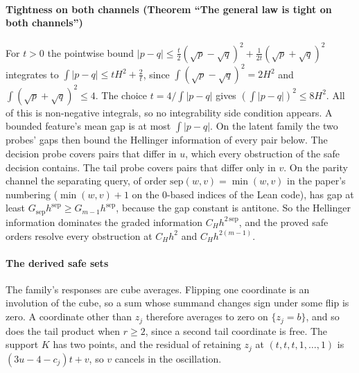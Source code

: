 \paragraph{Tightness on both channels (Theorem ``The general law is tight on both channels'')} For
$t>0$ the pointwise bound
$|p-q|\le\frac t2(\sqrt p-\sqrt q)^{2}+\frac1{2t}(\sqrt p+\sqrt q)^{2}$ integrates to
$\int|p-q|\le tH^{2}+\frac2t$, since $\int(\sqrt p-\sqrt q)^{2}=2H^{2}$ and
$\int(\sqrt p+\sqrt q)^{2}\le4$. The choice $t=4/\int|p-q|$ gives $(\int|p-q|)^{2}\le8H^{2}$. All of this
is non-negative integrals, so no integrability side condition appears. A bounded feature's mean
gap is at most $\int|p-q|$. On the latent family the two probes' gaps then bound the Hellinger
information of every pair below. The decision probe covers pairs that differ in $u$, which every
obstruction of the safe decision contains. The tail probe covers pairs that differ only in $v$. On
the parity channel the separating query, of order $\mathrm{sep}(w,v)=\min(w,v)$ in the paper's
numbering ($\min(w,v)+1$ on the $0$-based indices of the Lean code), has gap at least
$G_{\mathrm{sep}}h^{\mathrm{sep}}\ge G_{m-1}h^{\mathrm{sep}}$, because the gap constant is antitone. So the
Hellinger information dominates the graded information $C_{H}h^{2\,\mathrm{sep}}$, and the proved safe
orders resolve every obstruction at $C_{H}h^{2}$ and $C_{H}h^{2(m-1)}$.


\paragraph{The derived safe sets} The family's responses are cube averages. Flipping one
coordinate is an involution of the cube, so a sum whose summand changes sign under some flip is
zero. A coordinate other than $z_{j}$ therefore averages to zero on $\{z_{j}=b\}$, and so does the
tail product when $r\ge2$, since a second tail coordinate is free. The support $K$ has two points,
and the residual of retaining $z_{j}$ at $(t,t,t,1,\dots,1)$ is $(3u-4-c_{j})t+v$, so $v$ cancels in the
oscillation.


